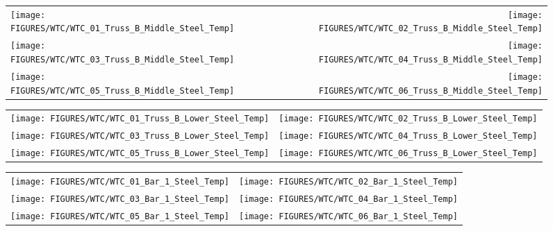 \begin{figure}[p]
\begin{tabular*}{\textwidth}{l@{\extracolsep{\fill}}r}
\texttt{[image: FIGURES/WTC/WTC\_01\_Truss\_B\_Middle\_Steel\_Temp]} &
\texttt{[image: FIGURES/WTC/WTC\_02\_Truss\_B\_Middle\_Steel\_Temp]} \\
\texttt{[image: FIGURES/WTC/WTC\_03\_Truss\_B\_Middle\_Steel\_Temp]} &
\texttt{[image: FIGURES/WTC/WTC\_04\_Truss\_B\_Middle\_Steel\_Temp]} \\
\texttt{[image: FIGURES/WTC/WTC\_05\_Truss\_B\_Middle\_Steel\_Temp]} &
\texttt{[image: FIGURES/WTC/WTC\_06\_Truss\_B\_Middle\_Steel\_Temp]}
\end{tabular*}
\label{NIST_WTC_Truss_B_Middle_Steel_Temp}
\end{figure}

\begin{figure}[p]
\begin{tabular*}{\textwidth}{l@{\extracolsep{\fill}}r}
\texttt{[image: FIGURES/WTC/WTC\_01\_Truss\_B\_Lower\_Steel\_Temp]} &
\texttt{[image: FIGURES/WTC/WTC\_02\_Truss\_B\_Lower\_Steel\_Temp]} \\
\texttt{[image: FIGURES/WTC/WTC\_03\_Truss\_B\_Lower\_Steel\_Temp]} &
\texttt{[image: FIGURES/WTC/WTC\_04\_Truss\_B\_Lower\_Steel\_Temp]} \\
\texttt{[image: FIGURES/WTC/WTC\_05\_Truss\_B\_Lower\_Steel\_Temp]} &
\texttt{[image: FIGURES/WTC/WTC\_06\_Truss\_B\_Lower\_Steel\_Temp]}
\end{tabular*}
\label{NIST_WTC_Truss_B_Lower_Steel_Temp}
\end{figure}


\begin{figure}[p]
\begin{tabular*}{\textwidth}{l@{\extracolsep{\fill}}r}
\texttt{[image: FIGURES/WTC/WTC\_01\_Bar\_1\_Steel\_Temp]} &
\texttt{[image: FIGURES/WTC/WTC\_02\_Bar\_1\_Steel\_Temp]} \\
\texttt{[image: FIGURES/WTC/WTC\_03\_Bar\_1\_Steel\_Temp]} &
\texttt{[image: FIGURES/WTC/WTC\_04\_Bar\_1\_Steel\_Temp]} \\
\texttt{[image: FIGURES/WTC/WTC\_05\_Bar\_1\_Steel\_Temp]} &
\texttt{[image: FIGURES/WTC/WTC\_06\_Bar\_1\_Steel\_Temp]}
\end{tabular*}
\label{NIST_WTC_Bar_1_Steel_Temp}
\end{figure}

